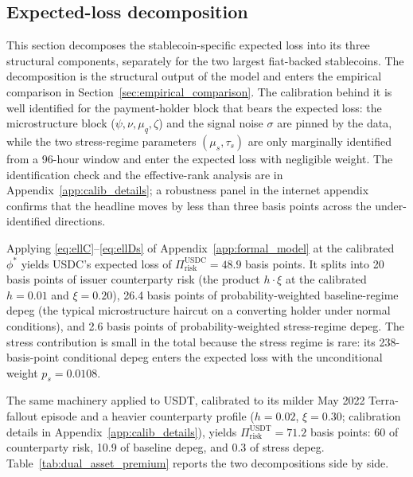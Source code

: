\subsection{Expected-loss decomposition}\label{sec:identification}

This section decomposes the stablecoin-specific expected loss into its three structural components, separately for the two largest fiat-backed stablecoins. The decomposition is the structural output of the model and enters the empirical comparison in Section~\ref{sec:empirical_comparison}. The calibration behind it is well identified for the payment-holder block that bears the expected loss: the microstructure block ($\psi, \nu, \mu_q, \zeta$) and the signal noise $\sigma$ are pinned by the data, while the two stress-regime parameters $(\mu_s, \tau_s)$ are only marginally identified from a 96-hour window and enter the expected loss with negligible weight. The identification check and the effective-rank analysis are in Appendix~\ref{app:calib_details}; a robustness panel in the internet appendix confirms that the headline moves by less than three basis points across the under-identified directions.

Applying \eqref{eq:ellC}--\eqref{eq:ellDs} of Appendix~\ref{app:formal_model} at the calibrated $\phi^*$ yields USDC's expected loss of $\Pi_{\text{risk}}^{\text{USDC}} = 48.9$ basis points. It splits into 20 basis points of issuer counterparty risk (the product $h \cdot \xi$ at the calibrated $h = 0.01$ and $\xi = 0.20$), 26.4 basis points of probability-weighted baseline-regime depeg (the typical microstructure haircut on a converting holder under normal conditions), and 2.6 basis points of probability-weighted stress-regime depeg. The stress contribution is small in the total because the stress regime is rare: its 238-basis-point conditional depeg enters the expected loss with the unconditional weight $p_s = 0.0108$.

The same machinery applied to USDT, calibrated to its milder May 2022 Terra-fallout episode and a heavier counterparty profile ($h = 0.02$, $\xi = 0.30$; calibration details in Appendix~\ref{app:calib_details}), yields $\Pi_{\text{risk}}^{\text{USDT}} = 71.2$ basis points: 60 of counterparty risk, 10.9 of baseline depeg, and 0.3 of stress depeg. Table~\ref{tab:dual_asset_premium} reports the two decompositions side by side.

